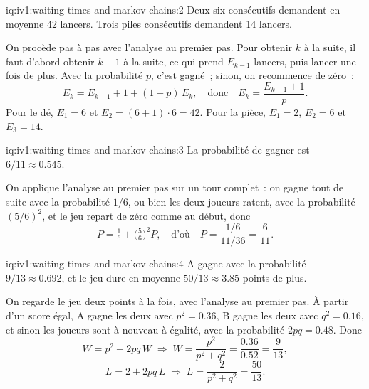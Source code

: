 \begin{solution}{iq:iv1:waiting-times-and-markov-chains:2}
Deux six consécutifs demandent en moyenne 42 lancers. Trois piles consécutifs demandent 14 lancers.

On procède pas à pas avec l'analyse au premier pas. Pour obtenir $k$ à la suite, il faut d'abord obtenir $k - 1$ à la suite, ce qui prend $E_{k-1}$ lancers, puis lancer une fois de plus. Avec la probabilité $p$, c'est gagné~; sinon, on recommence de zéro~:
\[
E_k = E_{k-1} + 1 + (1 - p)\,E_k, \quad\text{donc}\quad E_k = \frac{E_{k-1} + 1}{p}.
\]
Pour le dé, $E_1 = 6$ et $E_2 = (6 + 1) \cdot 6 = 42$. Pour la pièce, $E_1 = 2$, $E_2 = 6$ et $E_3 = 14$.

\end{solution}

\begin{solution}{iq:iv1:waiting-times-and-markov-chains:3}
La probabilité de gagner est $6/11 \approx 0.545$.

On applique l'analyse au premier pas sur un tour complet~: on gagne tout de suite avec la probabilité $1/6$, ou bien les deux joueurs ratent, avec la probabilité $(5/6)^2$, et le jeu repart de zéro comme au début, donc
\[
P = \tfrac16 + \bigl(\tfrac56\bigr)^2 P, \quad\text{d'où}\quad P = \frac{1/6}{11/36} = \frac{6}{11}.
\]
\end{solution}

\enlargethispage{-3\baselineskip}%
\begin{solution}{iq:iv1:waiting-times-and-markov-chains:4}
A gagne avec la probabilité $9/13 \approx 0.692$, et le jeu dure en moyenne $50/13 \approx 3.85$ points de plus.

On regarde le jeu deux points à la fois, avec l'analyse au premier pas. À partir d'un score égal, A gagne les deux avec $p^2 = 0.36$, B gagne les deux avec $q^2 = 0.16$, et sinon les joueurs sont à nouveau à égalité, avec la probabilité $2pq = 0.48$. Donc
\[
W = p^2 + 2pq\,W \;\Rightarrow\; W = \frac{p^2}{p^2 + q^2} = \frac{0.36}{0.52} = \frac{9}{13},
\]
\[
L = 2 + 2pq\,L \;\Rightarrow\; L = \frac{2}{p^2 + q^2} = \frac{50}{13}.
\]
\end{solution}

